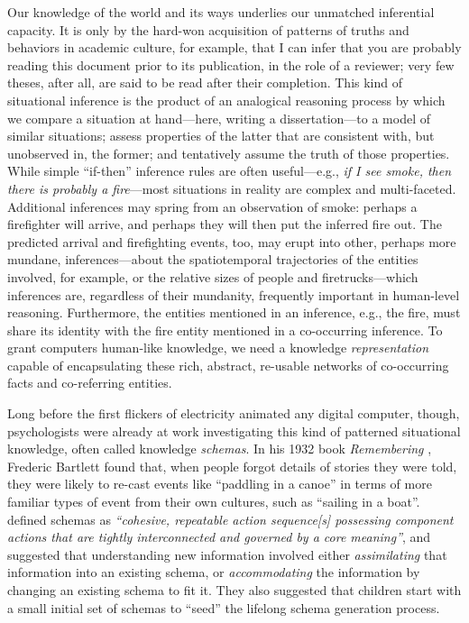 Our knowledge of the world and its ways underlies our unmatched inferential capacity.
It is only by the hard-won acquisition of patterns of truths and behaviors in academic culture, for example, that I can infer that you are probably reading this document prior to its publication, in the role of a reviewer; very few theses, after all, are said to be read after their completion.
This kind of situational inference is the product of an analogical reasoning process by which we compare a situation at hand---here, writing a dissertation---to a model of similar situations; assess properties of the latter that are consistent with, but unobserved in, the former; and tentatively assume the truth of those properties.
While simple ``if-then'' inference rules are often useful---e.g., \textit{if I see smoke, then there is probably a fire}---most situations in reality are complex and multi-faceted. Additional inferences may spring from an observation of smoke: perhaps a firefighter will arrive, and perhaps they will then put the inferred fire out. The predicted arrival and firefighting events, too, may erupt into other, perhaps more mundane, inferences---about the spatiotemporal trajectories of the entities involved, for example, or the relative sizes of people and firetrucks---which inferences are, regardless of their mundanity, frequently important in human-level reasoning. Furthermore, the entities mentioned in an inference, e.g., the fire, must share its identity with the fire entity mentioned in a co-occurring inference. To grant computers human-like knowledge, we need a knowledge \textit{representation} capable of encapsulating these rich, abstract, re-usable networks of co-occurring facts and co-referring entities.

Long before the first flickers of electricity animated any digital computer, though, psychologists were already at work investigating this kind of patterned situational knowledge, often called knowledge \textit{schemas}.
In his 1932 book \textit{Remembering} \citep{bartlett1995remembering}, Frederic Bartlett found that, when people forgot details of stories they were told, they were likely to re-cast events like ``paddling in a canoe'' in terms of more familiar types of event from their own cultures, such as ``sailing in a boat''. \citet{piaget1952origins} defined schemas as \textit{``cohesive, repeatable action sequence[s] possessing component actions that are tightly interconnected and governed by a core meaning''}, and suggested that understanding new information involved either \textit{assimilating} that information into an existing schema, or \textit{accommodating} the information by changing an existing schema to fit it. They also suggested that children start with a small initial set of schemas to ``seed'' the lifelong schema generation process.


